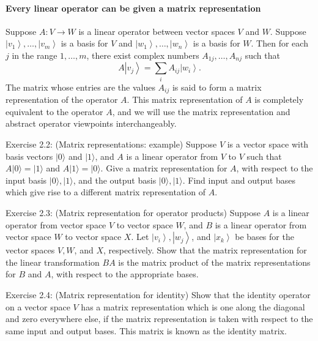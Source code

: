 \paragraph{Every linear operator can be given a matrix representation}
Suppose $A: V \rightarrow W$ is a linear operator between vector spaces $V$ and $W$. Suppose $\left|v_{1}\right\rangle, \ldots,\left|v_{m}\right\rangle$ is a basis for $V$ and $\left|w_{1}\right\rangle, \ldots,\left|w_{n}\right\rangle$ is a basis for $W$. Then for each $j$ in the range $1, \ldots, m$, there exist complex numbers $A_{1 j}, \dots, A_{n j}$ such that
$$
A\left|v_{j}\right\rangle=\sum_{i} A_{i j}\left|w_{i}\right\rangle.
$$
The matrix whose entries are the values $A_{i j}$ is said to form a matrix representation of the operator $A$. This matrix representation of $A$ is completely equivalent to the operator $A$, and we will use the matrix representation and abstract operator viewpoints interchangeably. 



\begin{exercise}
Exercise 2.2: (Matrix representations: example) Suppose $V$ is a vector space with basis vectors $|0\rangle$ and $|1\rangle$, and $A$ is a linear operator from $V$ to $V$ such that $A|0\rangle=|1\rangle$ and $A|1\rangle=|0\rangle$. Give a matrix representation for $A$, with respect to the input basis $|0\rangle,|1\rangle$, and the output basis $|0\rangle,|1\rangle$. Find input and output bases which give rise to a different matrix representation of $A$.
\end{exercise}

\begin{exercise}
Exercise 2.3: (Matrix representation for operator products) Suppose $A$ is a linear operator from vector space $V$ to vector space $W$, and $B$ is a linear operator from vector space $W$ to vector space $X$. Let $\left|v_{i}\right\rangle,\left|w_{j}\right\rangle$, and $\left|x_{k}\right\rangle$ be bases for the vector spaces $V, W$, and $X$, respectively. Show that the matrix representation for the linear transformation $B A$ is the matrix product of the matrix representations for $B$ and $A$, with respect to the appropriate bases.
\end{exercise}

\begin{exercise}
Exercise 2.4: (Matrix representation for identity) Show that the identity operator on a vector space $V$ has a matrix representation which is one along the diagonal and zero everywhere else, if the matrix representation is taken with respect to the same input and output bases. This matrix is known as the identity matrix.
\end{exercise}